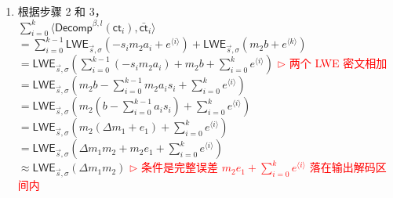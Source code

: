 \begin{myproof}
\begin{enumerate}
$\gap{$\cdots$} + \textsf{LWE}_{\vec{s}, \sigma}\left(-a_{\langle i, l\rangle}s_im_2\dfrac{q}{\beta^l} + a_{\langle i, l \rangle}e_{i,l}\right)\Bigg)$ \\
$= \sum\limits_{i=0}^{k-1}\textsf{LWE}_{\vec{s}, \sigma}\left(-a_{\langle i, 1\rangle}s_im_2\dfrac{q}{\beta^1} -a_{\langle i, 2\rangle}s_im_2\dfrac{q}{\beta^2} + \gap{$\cdots$} -a_{\langle i, l\rangle}s_im_2\dfrac{q}{\beta^l} + a_{\langle i, 1 \rangle}e_{i,1} + \cdots + a_{\langle i, l \rangle}e_{i,l}\right)$ \\
$= \sum\limits_{i=0}^{k-1}\textsf{LWE}_{\vec{s}, \sigma}\left(-s_im_2 \cdot \left(a_{\langle i, 1\rangle}\dfrac{q}{\beta^1} + a_{\langle i, 2\rangle}\dfrac{q}{\beta^2} + \gap{$\cdots$} + a_{\langle i, l\rangle}\dfrac{q}{\beta^l}\right) + a_{\langle i, 1 \rangle}e_{i,1} + \cdots + a_{\langle i, l \rangle}e_{i,l}\right)$ \\
$= \sum\limits_{i=0}^{k-1}\textsf{LWE}_{\vec{s}, \sigma}(-s_im_2a_i + e^{\langle i \rangle})$ \textcolor{red}{ $\rhd$ 其中 $e^{\langle i \rangle} = a_{\langle i, 1 \rangle}e_{i,1} + \cdots + a_{\langle i, l \rangle}e_{i,l}$}
\item 根据步骤 2 和 3， \\
$\sum\limits_{i=0}^{k}\langle \textsf{Decomp}^{\beta, l}(\textsf{ct}_i), \bar{\textsf{ct}}_i \rangle$ \\
$= \sum\limits_{i=0}^{k-1}\textsf{LWE}_{\vec{s}, \sigma}(-s_im_2a_i + e^{\langle i \rangle}) + \textsf{LWE}_{\vec{s}, \sigma} (m_{2}b + e^{\langle k \rangle})$ \\ 
$= \textsf{LWE}_{\vec{s}, \sigma}\left(\sum\limits_{i=0}^{k-1}(-s_im_2a_i) + m_{2}b + \sum\limits_{i=0}^ke^{\langle i \rangle}\right)$ \textcolor{red}{ $\rhd$ 两个 LWE 密文相加} \\
$= \textsf{LWE}_{\vec{s}, \sigma}\left(m_2b - \sum\limits_{i=0}^{k-1}m_2a_is_i + \sum\limits_{i=0}^ke^{\langle i \rangle}\right)$  \\ 
$= \textsf{LWE}_{\vec{s}, \sigma}\left(m_2(b - \sum\limits_{i=0}^{k-1}a_is_i) + \sum\limits_{i=0}^ke^{\langle i \rangle}\right)$\\
$= \textsf{LWE}_{\vec{s}, \sigma}\left(m_2(\Delta m_1 + e_1) + \sum\limits_{i=0}^ke^{\langle i \rangle}\right)$ \\
$= \textsf{LWE}_{\vec{s}, \sigma}\left(\Delta m_1m_2 + m_2e_1 + \sum\limits_{i=0}^ke^{\langle i \rangle}\right)$ \\
$\approx \textsf{LWE}_{\vec{s}, \sigma}(\Delta m_1m_2)$ \textcolor{red}{ $\rhd$ 条件是完整误差 $m_2e_1+\sum\limits_{i=0}^ke^{\langle i\rangle}$ 落在输出解码区间内}
\end{enumerate}

\end{myproof}

